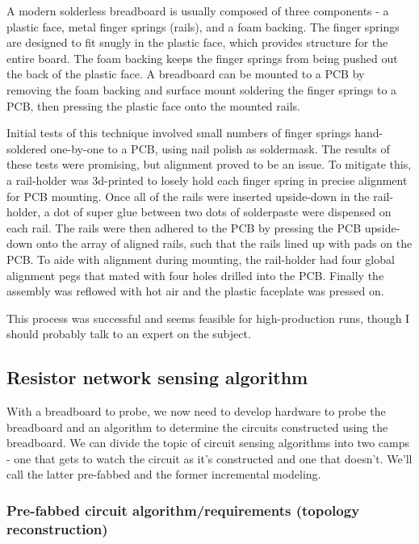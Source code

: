 \documentclass[11pt, a4paper]{article}
\begin{document}
A modern solderless breadboard is usually composed of three components - a plastic face, metal finger springs (rails), and a foam backing.
The finger springs are designed to fit snugly in the plastic face, which provides structure for the entire board.
The foam backing keeps the finger springs from being pushed out the back of the plastic face.
A breadboard can be mounted to a PCB by removing the foam backing and surface mount soldering the finger springs to a PCB, then pressing the plastic face onto the mounted rails.

Initial tests of this technique involved small numbers of finger springs hand-soldered one-by-one to a PCB, using nail polish as soldermask.
The results of these tests were promising, but alignment proved to be an issue.
To mitigate this, a rail-holder was 3d-printed to losely hold each finger spring in precise alignment for PCB mounting.
Once all of the rails were inserted upside-down in the rail-holder, a dot of super glue between two dots of solderpaste were dispensed on each rail.
The rails were then adhered to the PCB by pressing the PCB upside-down onto the array of aligned rails, such that the rails lined up with pads on the PCB. 
To aide with alignment during mounting, the rail-holder had four global alignment pegs that mated with four holes drilled into the PCB.
Finally the assembly was reflowed with hot air and the plastic faceplate was pressed on.

This process was successful and seems feasible for high-production runs, though I should probably talk to an expert on the subject.

\subsection{Resistor network sensing algorithm}

With a breadboard to probe, we now need to develop hardware to probe the breadboard and an algorithm to determine the circuits constructed using the breadboard.
We can divide the topic of circuit sensing algorithms into two camps - one that gets to watch the circuit as it's constructed and one that doesn't.
We'll call the latter pre-fabbed and the former incremental modeling.

\subsubsection{Pre-fabbed circuit algorithm/requirements (topology reconstruction)}
\end{document}
